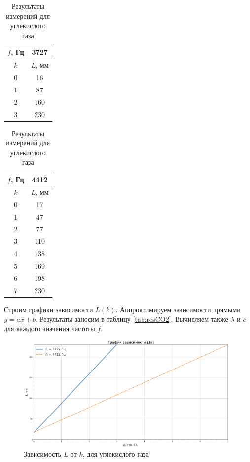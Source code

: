 \documentclass[a4paper,12pt]{article}
\theoremstyle{definition}
\begin{document}
	\begin{table}[!htb]
		
		\begin{minipage}{.5\linewidth}
			\centering
			\begin{tabular}{|c|c|}
				\hline
				$ f $, Гц & \textbf{3727}  \\ \hline
				$ k $ & $  L $, мм   \\ \hline
				0 & 16 \\ \hline
				1 & 87 \\ \hline
				2 & 160 \\ \hline
				3 & 230 \\ \hline
			\end{tabular}
		\end{minipage}%
		\begin{minipage}{.5\linewidth}
			\centering
			\begin{tabular}{|c|c|}
				\hline
				$ f $, Гц & \textbf{4412}  \\ \hline
				$ k $ & $  L $, мм   \\ \hline
				0 & 17 \\ \hline
				1 & 47 \\ \hline
				2 & 77 \\ \hline
				3 & 110 \\ \hline
				4 & 138 \\ \hline
				5 & 169 \\ \hline
				6 & 198 \\ \hline
				7 & 230 \\ \hline
			\end{tabular}
		\end{minipage}
		\caption{Результаты измерений для углекислого газа}
		\label{tab:CO2}
	\end{table}
	
	Строим графики зависимости $ L(k) $. Аппроксимируем зависимости прямыми $ y=ax+b $. Результаты заносим в таблицу \ref{tab:resCO2}. Вычисляем также $ \lambda $ и $ c $ для каждого значения частоты $ f $.
	
	\begin{figure}[h!]
		\centering
		\includegraphics[scale=0.542]{graph3}
		\caption{Зависимость $ L $ от $ k $, для углекислого газа}
		\label{graph2}
	\end{figure}
	
\end{document}
